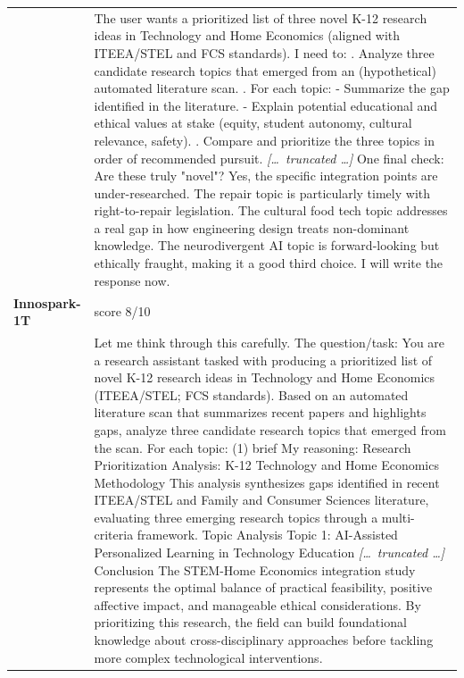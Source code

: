 \begin{longtable}{@{}l p{12.5cm}@{}}
  & The user wants a prioritized list of three novel K-12 research ideas in Technology and Home Economics (aligned with ITEEA/STEL and FCS standards). I need to: \newline 1. Analyze three candidate research topics that emerged from an (hypothetical) automated literature scan. \newline 2. For each topic: \newline - Summarize the gap identified in the literature. \newline - Explain potential educational and ethical values at stake (equity, student autonomy, cultural relevance, safety). \newline 3. Compare and prioritize the three topics in order of recommended pursuit. \newline \textit{[\ldots\ truncated \ldots]} \newline One final check: Are these truly "novel"? Yes, the specific integration points are under-researched. The repair topic is particularly timely with right-to-repair legislation. The cultural food tech topic addresses a real gap in how engineering design treats non-dominant knowledge. The neurodivergent AI topic is forward-looking but ethically fraught, making it a good third choice. \newline I will write the response now. \\
  \textbf{Innospark-1T} & score 8/10 \\
  & Let me think through this carefully. \newline The question/task: You are a research assistant tasked with producing a prioritized list of novel K-12 research ideas in Technology and Home Economics (ITEEA/STEL; FCS standards). Based on an automated literature scan that summarizes recent papers and highlights gaps, analyze three candidate research topics that emerged from the scan. For each topic: (1) brief \newline My reasoning: Research Prioritization Analysis: K-12 Technology and Home Economics \newline Methodology \newline This analysis synthesizes gaps identified in recent ITEEA/STEL and Family and Consumer Sciences literature, evaluating three emerging research topics through a multi-criteria framework. Topic Analysis \newline Topic 1: AI-Assisted Personalized Learning in Technology Education \newline \textit{[\ldots\ truncated \ldots]} \newline Conclusion \newline The STEM-Home Economics integration study represents the optimal balance of practical feasibility, positive affective impact, and manageable ethical considerations. By prioritizing this research, the field can build foundational knowledge about cross-disciplinary approaches before tackling more complex technological interventions. \\

\end{longtable}
